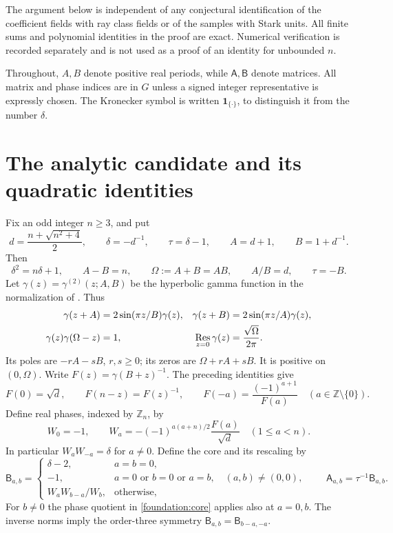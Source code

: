 \documentclass[11pt]{article}
\numberwithin{equation}{section}
\theoremstyle{definition}
\theoremstyle{remark}
\begin{document}
The argument below is independent of any conjectural identification of
the coefficient fields with ray class fields or of the samples with Stark
units. All finite sums and polynomial identities in the proof are exact.
Numerical verification is recorded separately and is not used as a proof
of an identity for unbounded $n$.

Throughout, $A,B$ denote positive real periods, while $\mathsf A,\mathsf B$
denote matrices. All matrix and phase indices are in $G$ unless a signed
integer representative is expressly chosen. The Kronecker symbol is
written $\mathbf1_{\{\cdot\}}$, to distinguish it from the number $\delta$.


\section{The analytic candidate and its quadratic identities}

Fix an odd integer $n\geq3$, and put
\[
 d=\frac{n+\sqrt{n^2+4}}2,\qquad \delta=-d^{-1},\qquad
 \tau=\delta-1,\qquad A=d+1,\qquad B=1+d^{-1}.
\]
Then
\[
 \delta^2=n\delta+1,\qquad A-B=n,\qquad
 \Omega:=A+B=AB,\qquad A/B=d,\qquad \tau=-B.
\]
Let $\gamma(z)=\gamma^{(2)}(z;A,B)$ be the hyperbolic gamma
function in the normalization of \cite{BSS}. Thus
\begin{align}
 \gamma(z+A)&=2\sin(\pi z/B)\gamma(z),&
 \gamma(z+B)&=2\sin(\pi z/A)\gamma(z),\label{foundation:shifts}\\
 \gamma(z)\gamma(\Omega-z)&=1,&
 \mathop{\rm Res}_{z=0}\gamma(z)&=\frac{\sqrt\Omega}{2\pi}.
 \label{foundation:reflection}
\end{align}
Its poles are $-rA-sB$, $r,s\geq0$; its zeros are
$\Omega+rA+sB$. It is positive on $(0,\Omega)$.
Write $F(z)=\gamma(B+z)^{-1}$. The preceding identities give
\[
 F(0)=\sqrt d,\qquad F(n-z)=F(z)^{-1},\qquad
 F(-a)=\frac{(-1)^{a+1}}{F(a)}\quad(a\in\mathbb Z\setminus\{0\}).
\]
Define real phases, indexed by $\mathbb Z_n$, by
\begin{equation}\label{foundation:phases}
 W_0=-1,\qquad
 W_a=-(-1)^{a(a+n)/2}\frac{F(a)}{\sqrt d}\quad(1\leq a<n).
\end{equation}
In particular $W_aW_{-a}=\delta$ for $a\ne0$.
Define the core and its rescaling by
\begin{equation}\label{foundation:core}
 \mathsf B_{a,b}=
 \begin{cases}
  \delta-2,&a=b=0,\\
  -1,&a=0\text{ or }b=0\text{ or }a=b,\quad(a,b)\ne(0,0),\\
  W_aW_{b-a}/W_b,&\text{otherwise},
 \end{cases}
 \qquad \mathsf A_{a,b}=\tau^{-1}\mathsf B_{a,b}.
\end{equation}
For $b\ne0$ the phase quotient in \eqref{foundation:core} applies
also at $a=0,b$. The inverse norms imply the order-three symmetry
$\mathsf B_{a,b}=\mathsf B_{b-a,-a}$.
\end{document}
